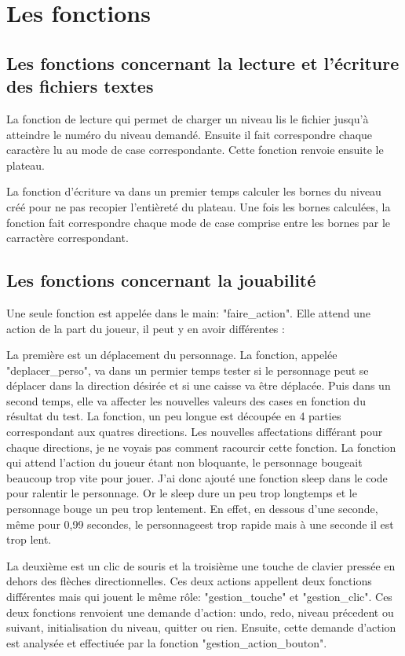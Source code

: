 \documentclass{report}
\begin{document}
	\chapter{Les fonctions}
		\section{Les fonctions concernant la lecture et l'écriture des fichiers textes}
La fonction de lecture qui permet de charger un niveau lis le fichier jusqu'à atteindre le numéro du niveau demandé. Ensuite il fait correspondre chaque caractère lu au mode de case correspondante. Cette fonction renvoie ensuite le plateau.


La fonction d'écriture va dans un premier temps calculer les bornes du niveau créé pour ne pas recopier l'entièreté du plateau. Une fois les bornes calculées, la fonction fait correspondre chaque mode de case comprise entre les bornes par le carractère correspondant. 

		\section{Les fonctions concernant la jouabilité}
Une seule fonction est appelée dans le main: "faire\_action". Elle attend une action de la part du joueur, il peut y en avoir différentes :


La première est un déplacement du personnage. La fonction, appelée "deplacer\_perso", va dans un permier temps tester si le personnage peut se déplacer dans la direction désirée et si une caisse va être déplacée.
Puis dans un second temps, elle va affecter les nouvelles valeurs des cases en fonction du résultat du test. La fonction, un peu longue est découpée en 4 parties correspondant aux quatres directions.
Les nouvelles affectations différant pour chaque directions, je ne voyais pas comment racourcir cette fonction.
La fonction qui attend l'action du joueur étant non bloquante, le personnage bougeait beaucoup trop vite pour jouer. J'ai donc ajouté une fonction sleep dans le code pour ralentir le personnage. Or le sleep dure un peu trop longtemps et le personnage bouge un peu trop lentement. En effet, en dessous d'une seconde, même pour 0,99 secondes, le personnageest trop rapide mais à une seconde il est trop lent.


La deuxième est un clic de souris et la troisième une touche de clavier pressée en dehors des flèches directionnelles. Ces deux actions appellent deux fonctions différentes mais qui jouent le même rôle: "gestion\_touche" et "gestion\_clic". Ces deux fonctions renvoient une demande d'action: undo, redo, niveau précedent ou suivant, initialisation du niveau, quitter ou rien.
Ensuite, cette demande d'action est analysée et effectiuée par la fonction "gestion\_action\_bouton".
	
\end{document}
